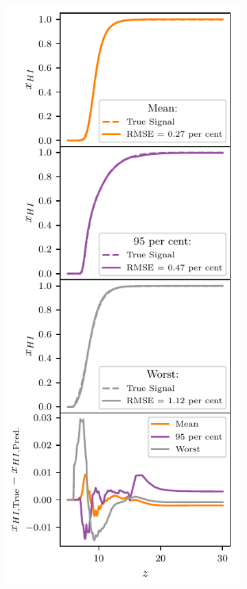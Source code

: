 \begin{figure}
\begin{subfigure}{0.5\textwidth}
        \includegraphics{globalemu/figs/test_best_worst_xHI.pdf}
    \end{subfigure}

\end{figure}
